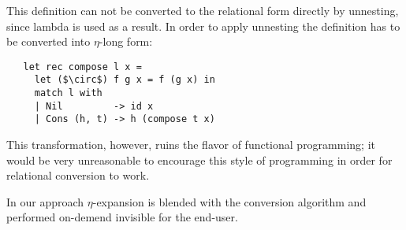 This definition can not be converted to the relational form directly by unnesting, since lambda is used as a result. 
In order to apply unnesting the definition has to be converted into $\eta$-long form:

\begin{lstlisting}
   let rec compose l x =
     let ($\circ$) f g x = f (g x) in  
     match l with
     | Nil         -> id x
     | Cons (h, t) -> h (compose t x)
\end{lstlisting}

This transformation, however, ruins the flavor of functional programming; it would be very unreasonable to encourage this
style of programming in order for relational conversion to work.

In our approach $\eta$-expansion is blended with the conversion algorithm and performed on-demend invisible for the end-user.








